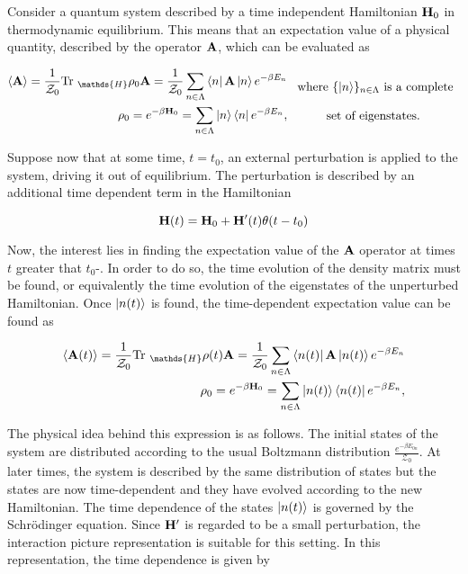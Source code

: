 \documentclass{homework}
\begin{document}
Consider a quantum system described by a time independent Hamiltonian ${\bf H}_0$ in thermodynamic equilibrium. This means that an expectation value of a physical quantity, described by the operator ${\bf A}$, which can be evaluated as 

\begin{equation}
    \begin{split}
        \langle {\bf A} \rangle = \frac{1}{\mathcal{Z}_0} \textnormal{Tr }_{\mathds{H}} \rho_0 {\bf A}  = \frac{1}{\mathcal{Z}_0} \sum_{n \in \Lambda} \bra{n} {{\bf A}} \ket{n} e^{-\beta E_n} \\
        \rho_0 = e^{-\beta {\bf H}_0} = \sum_{n \in \Lambda} \ket{n} \bra{n} e^{-\beta E_n},
    \end{split} \begin{array}{c}
         \textnormal{ where $\{\ket{n}\}_{n \in \Lambda}$ is a complete} \\
         \\
         \textnormal{set of eigenstates}.
    \end{array}
\end{equation}

Suppose now that at some time, $t = t_0$, an external perturbation is applied to the system, driving it out of equilibrium. The perturbation is described by an additional time dependent term in the Hamiltonian 

\begin{equation}
    {\bf H}(t) = {\bf H}_0 + {\bf H}'(t) \theta(t-t_0)
\end{equation}

Now, the interest lies in finding the expectation value of the ${\bf A}$ operator at times $t$ greater that $t_0$-. In order to do so, the time evolution of the density matrix must be found, or equivalently the time evolution of the eigenstates of the unperturbed Hamiltonian. Once $\ket{n(t)}$ is found, the time-dependent expectation value can be found as 

\begin{align}
        \langle {\bf A}(t) \rangle = \frac{1}{\mathcal{Z}_0} \textnormal{Tr }_{\mathds{H}} \rho(t) {\bf A}  = \frac{1}{\mathcal{Z}_0} \sum_{n \in \Lambda} \bra{n(t)} {{\bf A}} \ket{n(t)} e^{-\beta E_n} \\
        \rho_0 = e^{-\beta {\bf H}_0} = \sum_{n \in \Lambda} \ket{n(t)} \bra{n(t)} e^{-\beta E_n},
\end{align}

The physical idea behind this expression is as follows. The initial states of the system are distributed according to the usual Boltzmann distribution $\frac{e^{-\beta E_{0n}}}{\mathcal{Z_0}}$. At later times, the system is described by the same distribution of states but the states are now time-dependent and they have evolved according to the new Hamiltonian. The time dependence of the states $\ket{n(t)}$ is governed by the Schr\"odinger equation. Since ${\bf H}'$ is regarded to be a small perturbation, the interaction picture representation is suitable for this setting. In this representation, the time dependence is given by 
\end{document}
